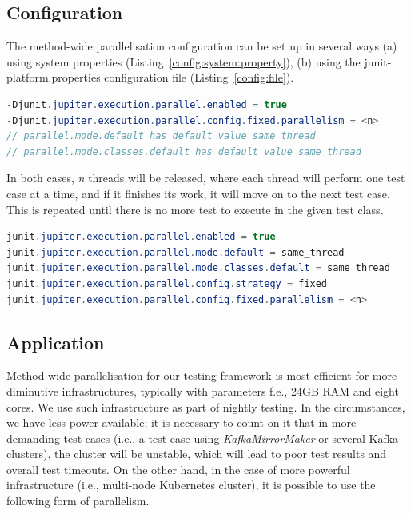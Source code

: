 \subsection{Configuration}
\label{05:sub:sec:configuration}

The method-wide parallelisation configuration can be set up in several ways (a) using system properties (Listing~\ref{config:system:property}),
(b) using the junit-platform.properties configuration file (Listing~\ref{config:file}).
\begin{lstlisting}[language= Java,label=config:system:property,caption=(a) Configuration via system properties,frame=tb]
-Djunit.jupiter.execution.parallel.enabled = true
-Djunit.jupiter.execution.parallel.config.fixed.parallelism = <n>
// parallel.mode.default has default value same_thread
// parallel.mode.classes.default has default value same_thread
\end{lstlisting}
In both cases, \emph{n} threads will be released, where each thread will perform one test case at a time, and if it finishes its work,
it will move on to the next test case. This is repeated until there is no more test to execute in the given test class.
\begin{lstlisting}[language=Java,label=config:file,caption=(b) Configuration via file,frame = tb]
junit.jupiter.execution.parallel.enabled = true
junit.jupiter.execution.parallel.mode.default = same_thread
junit.jupiter.execution.parallel.mode.classes.default = same_thread
junit.jupiter.execution.parallel.config.strategy = fixed
junit.jupiter.execution.parallel.config.fixed.parallelism = <n>
\end{lstlisting}

\subsection{Application}
\label{05:sub:sec:applicability}

Method-wide parallelisation for our testing framework is most efficient for more diminutive infrastructures,
typically with parameters f.e., 24GB RAM and eight cores. We use such infrastructure as part of nightly testing.
In the circumstances, we have less power available; it is necessary to count on it that in more demanding test cases
(i.e., a test case using \emph{KafkaMirrorMaker} or several Kafka clusters), the cluster will be unstable, which will
lead to poor test results and overall test timeouts. On the other hand, in the case of more powerful infrastructure
(i.e., multi-node Kubernetes cluster), it is possible to use the following form of parallelism.

